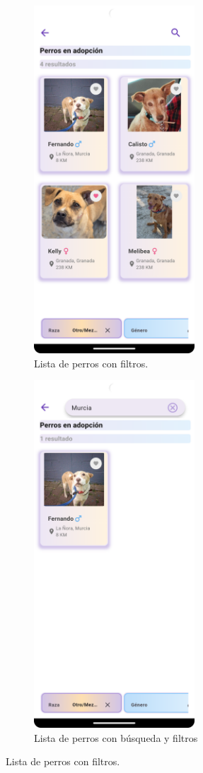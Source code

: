 \documentclass[a4paper, 12pt]{article}
\begin{document}
\begin{figure}[H]
   	\begin{subfigure}{0.48\textwidth}
		\begin{center}
			{\includegraphics[width=6cm]{app/DogListFilter.png}\par}
			\caption{Lista de perros con filtros.}
		\end{center}  
	\end{subfigure}\hfill
   	\begin{subfigure}{0.48\textwidth}
		\begin{center}
			{\includegraphics[width=6cm]{app/DogListSearchFilter.png}\par}
			\caption{Lista de perros con búsqueda y filtros}
		\end{center}  
	\end{subfigure}\hfill
	\caption{Lista de perros con filtros.}
\end{figure}
\end{document}
